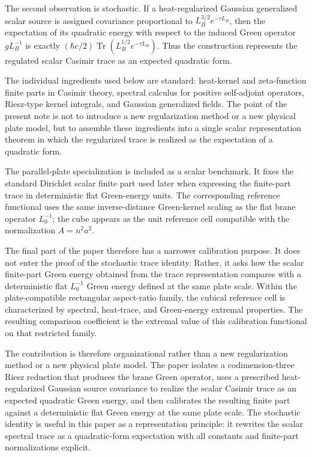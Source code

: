 \documentclass[11pt]{article}
\begin{document}
The second observation is stochastic.  If a heat-regularized Gaussian
generalized scalar source is assigned covariance proportional to
\(L_B^{3/2}e^{-\tau L_B}\), then the expectation of its quadratic energy with
respect to the induced Green operator \(gL_B^{-1}\) is exactly
\((\hbar c/2)\operatorname{Tr}(L_B^{1/2}e^{-\tau L_B})\).  Thus the construction
represents the regulated scalar Casimir trace as an expected quadratic form.

The individual ingredients used below are standard: heat-kernel and
zeta-function finite parts in Casimir theory, spectral calculus for positive
self-adjoint operators, Riesz-type kernel integrals, and Gaussian generalized
fields.  The point of the present note is not to introduce a new
regularization method or a new physical plate model, but to assemble these
ingredients into a single scalar representation theorem in which the
regularized trace is realized as the expectation of a quadratic form.

The parallel-plate specialization is included as a scalar benchmark.  It
fixes the standard Dirichlet scalar finite part used later when expressing the
finite-part trace in deterministic flat Green-energy units.  The corresponding
reference functional uses the same inverse-distance Green-kernel scaling as
the flat brane operator \(L_0^{-1}\); the cube appears as the unit reference
cell compatible with the normalization \(A=n^2a^2\).

The final part of the paper therefore has a narrower calibration purpose.
It does not enter the proof of the stochastic trace identity.  Rather, it
asks how the scalar finite-part Green energy obtained from the trace
representation compares with a deterministic flat \(L_0^{-1}\) Green energy
defined at the same plate scale.  Within the plate-compatible rectangular
aspect-ratio family, the cubical reference cell is characterized by spectral,
heat-trace, and Green-energy extremal properties.  The resulting comparison
coefficient is the extremal value of this calibration functional on that
restricted family.

The contribution is therefore organizational rather than a new
regularization method or a new physical plate model.  The paper isolates a
codimension-three Riesz reduction that produces the brane Green operator,
uses a prescribed heat-regularized Gaussian source covariance to realize the
scalar Casimir trace as an expected quadratic Green energy, and then
calibrates the resulting finite part against a deterministic flat Green
energy at the same plate scale.  The stochastic identity is useful in this
paper as a representation principle: it rewrites the scalar spectral trace
as a quadratic-form expectation with all constants and finite-part
normalizations explicit.
\end{document}

